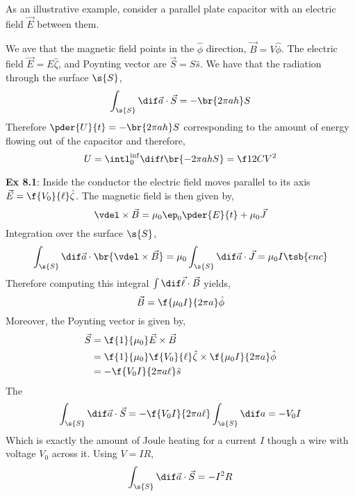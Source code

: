 \documentclass{article}
\begin{document}
As an illustrative example, consider a parallel plate capacitor with an electric field $\vec{E}$ between them.
\begin{center}
\end{center}
We ave that the magnetic field points in the $\hat{\phi}$ direction, $\vec{B} = V \hat{\phi}$. The electric field $\vec{E} = E \hat{\zeta}$, and Poynting vector are $\vec{S} = S \hat{s}$. We have that the radiation through the surface $\s{S}$,
\[ \int_{\s{S}} \dif \vec{a} \cdot \vec{S} = - \br{2 \pi a h} S \]
Therefore $\pder{U}{t} = - \br{2 \pi a h} S$ corresponding to the amount of energy flowing out of the capacitor and therefore,
\[ U = \intl_{0}^{\inf} \dif t \br{- 2 \pi a h S} = \f12 C V^2 \]

\textbf{Ex 8.1}:
Inside the conductor the electric field moves parallel to its axis $\vec{E} = \f{V_0}{\ell} \hat{\zeta}$. The magnetic field is then given by,
\[ \vdel \times \vec{B} = \mu_0 \ep_0 \pder{E}{t} + \mu_0 \vec{J} \]
Integration over the surface $\s{S}$,
\[ \int_{\s{S}} \dif \vec{a} \cdot \br{\vdel \times \vec{B}} = \mu_0 \int_{\s{S}} \dif \vec{a} \cdot \vec{J} = \mu_0 I\tsb{enc} \]
Therefore computing this integral $\int \dif \vec{\ell} \cdot \vec{B}$ yields,
\[ \vec{B} = \f{\mu_0I}{2\pi a}\hat{\phi} \]
Moreover, the Poynting vector is given by,
\begin{align*}
\vec{S} &= \f{1}{\mu_0} \vec{E}\times \vec{B} \\
&= \f{1}{\mu_0} \f{V_0}{\ell} \hat{\zeta} \times \f{\mu_0 I}{2 \pi a} \hat{\phi} \\
&= -\f{V_0 I}{2\pi a \ell}\hat{s}
\end{align*}
The
\[ \int_{\s{S}} \dif \vec{a} \cdot \vec{S} = -\f{V_0 I}{2 \pi a \ell} \int_{\s{S}} \dif a = - V_0 I \]
Which is exactly the amount of Joule heating for a current $I$ though a wire with voltage $V_0$ across it. Using $V = I R$,
\[ \int_{\s{S}} \dif \vec{a} \cdot \vec{S} = -I^2 R \]
\end{document}
